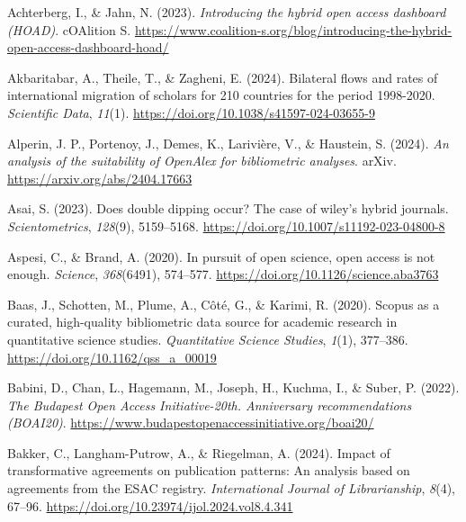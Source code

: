 \documentclass[a4paper,man,floatsintext,longtable,noextraspace,10pt]{apa6}
\newlength{\cslhangindent}
\newenvironment{CSLReferences}[2] %
{\begin{list}{}{%
  \setlength{\itemindent}{0pt}
  \setlength{\leftmargin}{0pt}
  \setlength{\parsep}{0pt}
  \ifodd #1
  \setlength{\leftmargin}{\cslhangindent}
  \setlength{\itemindent}{-1\cslhangindent}
  \fi
  \setlength{\itemsep}{#2\baselineskip}}}
{\end{list}}
\begin{document}
\label{refs}
\begin{CSLReferences}{1}{0}
Achterberg, I., \& Jahn, N. (2023). \emph{Introducing the hybrid open
access dashboard (HOAD)}. {cOAlition S}.
\url{https://www.coalition-s.org/blog/introducing-the-hybrid-open-access-dashboard-hoad/}

Akbaritabar, A., Theile, T., \& Zagheni, E. (2024). Bilateral flows and
rates of international migration of scholars for 210 countries for the
period 1998-2020. \emph{Scientific Data}, \emph{11}(1).
\url{https://doi.org/10.1038/s41597-024-03655-9}

Alperin, J. P., Portenoy, J., Demes, K., Larivière, V., \& Haustein, S.
(2024). \emph{An analysis of the suitability of OpenAlex for
bibliometric analyses}. arXiv. \url{https://arxiv.org/abs/2404.17663}

Asai, S. (2023). Does double dipping occur? The case of wiley's hybrid
journals. \emph{Scientometrics}, \emph{128}(9), 5159--5168.
\url{https://doi.org/10.1007/s11192-023-04800-8}

Aspesi, C., \& Brand, A. (2020). In pursuit of open science, open access
is not enough. \emph{Science}, \emph{368}(6491), 574--577.
\url{https://doi.org/10.1126/science.aba3763}

Baas, J., Schotten, M., Plume, A., Côté, G., \& Karimi, R. (2020).
Scopus as a curated, high-quality bibliometric data source for academic
research in quantitative science studies. \emph{Quantitative Science
Studies}, \emph{1}(1), 377--386.
\url{https://doi.org/10.1162/qss_a_00019}

Babini, D., Chan, L., Hagemann, M., Joseph, H., Kuchma, I., \& Suber, P.
(2022). \emph{{The Budapest Open Access Initiative-20th. Anniversary
recommendations (BOAI20)}}.
\url{https://www.budapestopenaccessinitiative.org/boai20/}

Bakker, C., Langham-Putrow, A., \& Riegelman, A. (2024). Impact of
transformative agreements on publication patterns: An analysis based on
agreements from the ESAC registry. \emph{International Journal of
Librarianship}, \emph{8}(4), 67--96.
\url{https://doi.org/10.23974/ijol.2024.vol8.4.341}


\end{CSLReferences}
\end{document}
